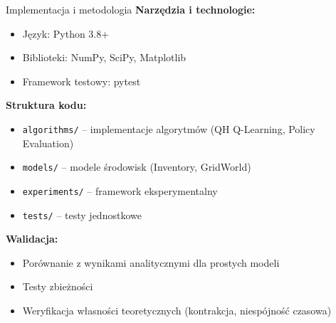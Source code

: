 \begin{frame}{Implementacja i metodologia}
\textbf{Narzędzia i technologie:}
\begin{itemize}
    \item Język: Python 3.8+
    \item Biblioteki: NumPy, SciPy, Matplotlib
    \item Framework testowy: pytest
\end{itemize}

\vspace{0.5em}
\textbf{Struktura kodu:}
\begin{itemize}
    \item \texttt{algorithms/} -- implementacje algorytmów (QH Q-Learning, Policy Evaluation)
    \item \texttt{models/} -- modele środowisk (Inventory, GridWorld)
    \item \texttt{experiments/} -- framework eksperymentalny
    \item \texttt{tests/} -- testy jednostkowe
\end{itemize}

\vspace{0.5em}
\textbf{Walidacja:}
\begin{itemize}
    \item Porównanie z wynikami analitycznymi dla prostych modeli
    \item Testy zbieżności
    \item Weryfikacja własności teoretycznych (kontrakcja, niespójność czasowa)
\end{itemize}
\end{frame}
